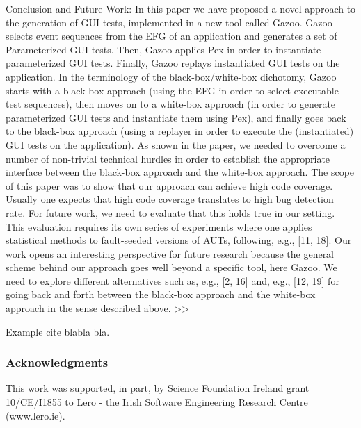 \documentclass[runningheads,a4paper]{llncs}
\begin{document}
Conclusion and Future Work: In this paper we have proposed a novel approach to the generation of 
GUI tests, implemented in a new tool called Gazoo. Gazoo selects event sequences
from the EFG of an application and generates a set of Parameterized GUI tests.
Then, Gazoo applies Pex in order to instantiate parameterized GUI tests. Finally,
Gazoo replays instantiated GUI tests on the application. In the terminology of
the black-box/white-box dichotomy, Gazoo starts with a black-box approach
(using the EFG in order to select executable test sequences), then moves on to a
white-box approach (in order to generate parameterized GUI tests and instantiate
them using Pex), and finally goes back to the black-box approach (using
a replayer in order to execute the (instantiated) GUI tests on the application).
As shown in the paper, we needed to overcome a number of non-trivial technical
hurdles in order to establish the appropriate interface between the black-box
approach and the white-box approach.
The scope of this paper was to show that our approach can achieve high
code coverage. Usually one expects that high code coverage translates to high
bug detection rate. For future work, we need to evaluate that this holds true
in our setting. This evaluation requires its own series of experiments where one
applies statistical methods to fault-seeded versions of AUTs, following, e.g., [11,
18].
Our work opens an interesting perspective for future research because the
general scheme behind our approach goes well beyond a specific tool, here Gazoo.
We need to explore different alternatives such as, e.g., [2, 16] and, e.g., [12, 19]
for going back and forth between the black-box approach and the white-box
approach in the sense described above.
>>

Example cite \cite{AbdelkaderLahmadi2005} blabla bla.



\subsubsection*{Acknowledgments}
This work was supported, in part, by Science Foundation Ireland grant 10/CE/I1855 to Lero - the Irish Software Engineering Research Centre (www.lero.ie).




\end{document}
